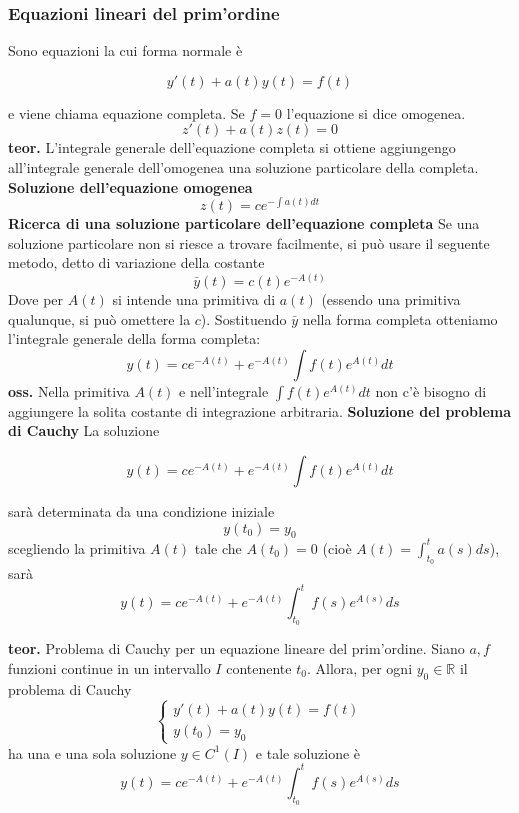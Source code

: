 \subsubsection{Equazioni lineari del prim'ordine}
Sono equazioni la cui forma normale è
\begin{tcolorbox}
\[
    y'(t) + a(t)y(t) = f(t)
\]
\end{tcolorbox}
e viene chiama equazione completa.\newline
Se $f = 0$ l'equazione si dice omogenea.
\[
    z'(t) + a(t)z(t) = 0
\]
\textbf{teor.} L'integrale generale dell'equazione completa si ottiene aggiungengo all'integrale generale dell'omogenea una soluzione particolare della completa.\newline
\textbf{Soluzione dell'equazione omogenea}
\[
    z(t) = c e^{-\int a(t) dt}
\]
\textbf{Ricerca di una soluzione particolare dell'equazione completa}\newline
Se una soluzione particolare non si riesce a trovare facilmente, si può usare il seguente metodo, detto di variazione della costante
\[
    \bar{y}(t) = c(t)e^{-A(t)}
\]
Dove per $A(t)$ si intende una primitiva di $a(t)$ (essendo una primitiva qualunque, si può omettere la $c$).\newline
Sostituendo $\bar{y}$ nella forma completa otteniamo l'integrale generale della forma completa:
\[
    y(t) = ce^{-A(t)} + e^{-A(t)}\int f(t)e^{A(t)}dt
\]
\textbf{oss.} Nella primitiva $A(t)$ e nell'integrale $\int f(t)e^{A(t)}dt$ non c'è bisogno di aggiungere la solita costante di integrazione arbitraria.\newline
\newline
\textbf{Soluzione del problema di Cauchy}\newline
La soluzione
\begin{tcolorbox} 
\[
    y(t) = ce^{-A(t)} + e^{-A(t)}\int f(t)e^{A(t)}dt
\]
\end{tcolorbox}
sarà determinata da una condizione iniziale
\[
    y(t_0) = y_0
\]
scegliendo la primitiva $A(t)$ tale che $A(t_0) = 0$ (cioè $A(t) = \int_{t_0}^{t}a(s)ds$), sarà
\[
    y(t) = ce^{-A(t)} + e^{-A(t)} \int_{t_0}^{t} f(s)e^{A(s)}ds
\]
\begin{tcolorbox}
\textbf{teor.} Problema di Cauchy per un equazione lineare del prim'ordine.\newline
Siano $a, f$ funzioni continue in un intervallo $I$ contenente $t_0$. Allora, per ogni $y_0 \in \mathbb{R}$ il problema di Cauchy
\[
    \begin{cases}
        y'(t) + a(t)y(t)= f(t)\\
        y(t_0) = y_0
    \end{cases}
\]
ha una e una sola soluzione $y \in C^1(I)$ e tale soluzione è
\[
    y(t) = ce^{-A(t)} + e^{-A(t)} \int_{t_0}^{t} f(s)e^{A(s)}ds
\]
\end{tcolorbox}
